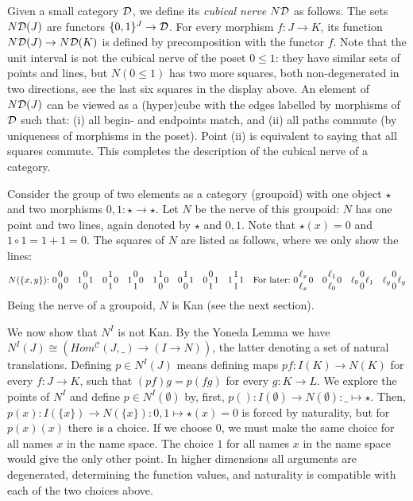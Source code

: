 \documentclass[10pt,a4paper]{article}
\newcommand{\CC}{{\mathcal C}}
\newcommand{\set}[1]{\{#1\}}
\begin{document}
\newcommand{\DD}{{\cal D}}
\newcommand{\ND}{N\DD}
Given a small category $\DD$, we define its \emph{cubical nerve}
$\ND$ as follows. The sets $\ND(J)$ are functors $\set{0,1}^J \to\DD$.
For every morphism $f:J\to K$, its function $\ND(J)\to\ND(K)$
is defined by precomposition with the functor $f$.
Note that the unit interval is not the cubical nerve of the poset $0\leq1$:
they have similar sets of points and lines, but $N(0\leq1)$ has two
more squares, both non-degenerated in two directions,
see the last six squares in the display above.
An element of $\ND(J)$ can be viewed as a (hyper)cube with
the edges labelled by morphisms of $\DD$ such that:
(i) all begin- and endpoints match, and
(ii) all paths commute (by uniqueness of morphisms in the poset).
Point (ii) is equivalent to saying that all squares commute.
This completes the description of the cubical nerve of a category.

Consider the group of two elements as a category (groupoid)
with one object $\star$ and two morphisms $0,1:\star\to\star$.
Let $N$ be the nerve of this groupoid:
$N$ has one point and two lines, again denoted by $\star$ and $0,1$.
Note that $\star(x) = 0$ and $1\circ 1 = 1+1=0$.
The squares of $N$ are listed as follows, where we only show the lines:
\[
\def\ol{{1 \atop 0}}
\def\oo{{0 \atop 0}}
\def\lo{{0 \atop 1}}
\def\ll{{1 \atop 1}}
N(\set{x,y}){:}~
0\oo0 \quad 1\oo1 \quad 0\ll0 \quad 1\lo0 \quad 1\ol0 \quad 0\ol1 \quad 0\lo1 \quad 1\ll1
\quad\mbox{For later:}~0{\ell_x \atop \ell_x}0 \quad 0{\ell_1 \atop \ell_0}0
\quad \ell_0{0 \atop 0}\ell_1 \quad \ell_y{0 \atop 0}\ell_y\]
Being the nerve of a groupoid, $N$ is Kan (see the next section).

We now show that $N^I$ is not Kan. By the Yoneda Lemma we have
$N^I(J)\cong (Hom^{\CC}(J,\_)\to (I\to N))$, the latter denoting a set
of natural translations.  Defining $p\in N^I(J)$ means defining maps
$pf:I(K)\to N(K)$ for every $f:J\to K$, such that $(pf)g=p(fg)$ for
every $g:K\to L$. We explore the points of $N^I$ and define $p\in
N^I(\emptyset)$ by, first, $p():I(\emptyset)\to
N(\emptyset):\_\mapsto\star$.  Then, $p(x):I(\set{x})\to N(\set{x}):
0,1 \mapsto\star(x)=0$ is forced by naturality, but for $p(x)(x)$
there is a choice. If we choose $0$, we must make the same choice for
all names $x$ in the name space.  The choice $1$ for all names $x$ in
the name space would give the only other point. In higher dimensions
all arguments are degenerated, determining the function values, and
naturality is compatible with each of the two choices above.
\end{document}
